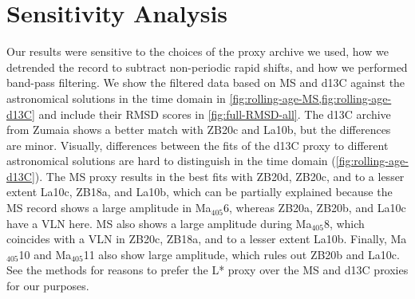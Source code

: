 \documentclass[draft]{agujournal2019}
\newcommand{\ma}[1]{Ma\(_{405}\)#1} %
\begin{document}

\renewcommand\thefigure{A\arabic{figure}}
\setcounter{figure}{0}

\section{Sensitivity Analysis}\label{sec:sensitivity}

Our results were sensitive to the choices of the proxy archive we used, how we detrended the record to subtract non-periodic rapid shifts, and how we performed band-pass filtering.
We show the filtered data based on \gls{MS} and \gls{d13C} against the astronomical solutions in the time domain in \cref{fig:rolling-age-MS,fig:rolling-age-d13C} and include their \gls{RMSD} scores in \cref{fig:full-RMSD-all}.
The \gls{d13C} archive from Zumaia shows a better match with ZB20c and La10b, but the differences are minor.
Visually, differences between the fits of the \gls{d13C} proxy to different astronomical solutions are hard to distinguish in the time domain (\cref{fig:rolling-age-d13C}).
The \gls{MS} proxy results in the best fits with ZB20d, ZB20c, and to a lesser extent La10c, ZB18a, and La10b, which can be partially explained because the \gls{MS} record shows a large amplitude in \ma{6}, whereas ZB20a, ZB20b, and La10c have a \gls{VLN} here.
\gls{MS} also shows a large amplitude during \ma{8}, which coincides with a \gls{VLN} in ZB20c, ZB18a, and to a lesser extent La10b.
Finally, \ma{10} and \ma{11} also show large amplitude, which rules out ZB20b and La10c.
See the methods for reasons to prefer the \gls{L*} proxy over the \gls{MS} and \gls{d13C} proxies for our purposes.
\end{document}
